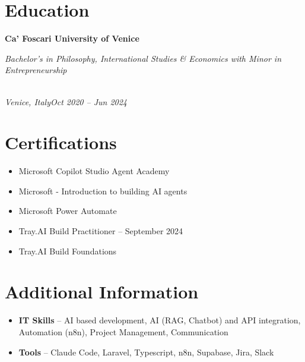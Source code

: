 \documentclass[a4paper,10pt]{article}
\newcommand{\role}[4]{\vspace{3pt}\noindent\hspace{0.6em}\parbox[t]{0.38\textwidth}{\raggedright\textbf{#1}}\hfill\parbox[t]{0.58\textwidth}{\raggedleft\textit{#2}}\\{\textit{#3}\hfill\textit{#4}}\vspace{1pt}}
\begin{document}
\section{Education}
\role{Ca' Foscari University of Venice}{Bachelor's in Philosophy, International Studies \& Economics with Minor in Entrepreneurship}{Venice, Italy}{Oct 2020 -- Jun 2024}

\section{Certifications}
\begin{itemize}
\item Microsoft Copilot Studio Agent Academy
\item Microsoft - Introduction to building AI agents
\item Microsoft Power Automate
\item Tray.AI Build Practitioner -- September 2024
\item Tray.AI Build Foundations
\end{itemize}

\section{Additional Information}
\begin{itemize}
\item \textbf{IT Skills} -- AI based development, AI (RAG, Chatbot) and API integration, Automation (n8n), Project Management, Communication
\item \textbf{Tools} -- Claude Code, Laravel, Typescript, n8n, Supabase, Jira, Slack
\end{itemize}
\end{document}
